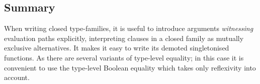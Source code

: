 \documentclass[demotion-paper.tex]{subfiles}
\begin{document}
\subsection{Summary}
When writing closed type-families, it is useful to introduce arguments \emph{witnessing} evaluation paths explicitly, interpreting clauses in a closed family as mutually exclusive alternatives.
It makes it easy to write its demoted singletonised functions.
As there are several variants of type-level equality; in this case it is convenient to use the type-level Boolean equality which takes only reflexivity into account.
\end{document}

